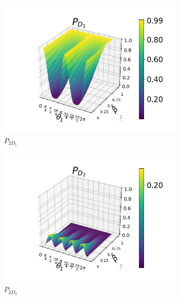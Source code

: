 \documentclass[12pt]{book}
\begin{document}
\begin{figure}[t!]
\centering
\begin{subfigure}[b]{0.4\linewidth}
\includegraphics[width=\linewidth]{images/PD1_v.png}
\caption{$P_{2D_{1}}$}
\label{fig:BS1}
\end{subfigure}
\begin{subfigure}[b]{0.4\linewidth}
\includegraphics[width=\linewidth]{images/PD2_v.png}
\caption{$P_{2D_{2}}$}
\label{fig:westminster_aerea}
\end{subfigure}
\begin{subfigure}[b]{0.4\linewidth}

\end{subfigure}
\end{figure}
\end{document}
